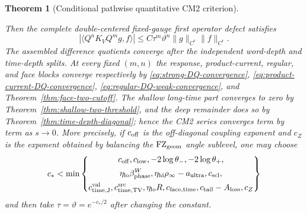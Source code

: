\documentclass[11pt]{article}
\newtheorem{theorem}{Theorem}[section]
\begin{document}
\begin{theorem}[Conditional pathwise quantitative CM2 criterion]
\begin{enumerate}[label=\textup{(H\arabic*)}]
\end{enumerate}
Then the complete double-centered fixed-gauge first operator defect satisfies
\[
 |\langle Q^nK_VQ^mg,f\rangle|
 \le C\tau^m\vartheta^n\|g\|_{C^r}\|f\|_{C^r}.
\]
The assembled difference quotients converge after the independent word-depth
and time-depth splits.  At every fixed $(m,n)$ the response,
product-current, regular, and face blocks converge respectively by
\eqref{eq:strong-DQ-convergence},
\eqref{eq:product-current-DQ-convergence},
\eqref{eq:regular-DQ-weak-convergence}, and
Theorem~\ref{thm:face-two-cutoff}.  The shallow long-time part converges to zero by
Theorem~\ref{thm:shallow-two-threshold}, and the deep remainder does so by
Theorem~\ref{thm:time-depth-diagonal}; hence the CM2 series converges term by
term as $s\to0$.  More
precisely, if $c_{\rm off}$ is the off-diagonal coupling exponent and $c_Z$
is the exponent obtained by balancing the $\mathrm{FZ}_{\rm geom}$ angle sublevel, one
may choose
\begin{equation}
\label{eq:final-CM2-exponent}
 c_*<\min\left\{
 \begin{gathered}
 c_{\rm off},c_{\rm low},-2\log\theta_-,-2\log\theta_+,\\
 \eta_{\rm lo}\beta_{\rm phase}^{W},
 \eta_{\rm hi}\rho_\infty-a_{\rm ultra},c_{\rm scl},\\
 c_{\rm time,J}^{\rm val},c_{\rm time,TV}^{\rm src},
 \eta_{\rm lo}R,c_{\rm face,time},c_{\rm tail}-A_{\rm loss},c_Z
 \end{gathered}
 \right\}
\end{equation}
and then take $\tau=\vartheta=e^{-c_*/2}$ after changing the constant.
\end{theorem}
\end{document}
